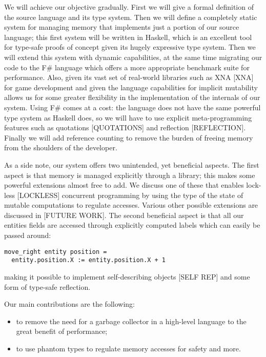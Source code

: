 We will achieve our objective gradually. First we will
give a formal definition of the source language and its
type system. Then we will define a completely static
system for managing memory that implements just a portion
of our source language; this first system will be written
in Haskell, which is an excellent tool for type-safe
proofs of concept given its hugely expressive type system. Then we will extend this system with dynamic capabilities,
at the same time migrating  our code to the F\# language which offers a more appropriate benchmark suite for performance. Also, given its vast set of real-world
libraries such as XNA [XNA] for game development and given
the language capabilities for implicit mutability allows 
us for some greater flexibility in the implementation of
the internals of our system. Using F\# comes at a cost:
the language does not have the same powerful type system
as Haskell does, so we will have to use explicit
meta-programming features such as quotations [QUOTATIONS]
and reflection [REFLECTION]. Finally we will add reference
counting to remove the burden of freeing memory from the
shoulders of the developer.


As a side note, our system offers two unintended, yet
beneficial aspects. The first aspect is that memory is
managed explicitly through a library; this makes some 
powerful extensions almost free to add. We discuss one
of these that enables lock-less [LOCKLESS] concurrent 
programming by using the type of the state of mutable
computations to regulate accesses. Various other possible
extensions are discussed in [FUTURE WORK]. The second
beneficial aspect is that all our entities fields are
accessed through explicitly computed labels which can
easily be passed around:

\begin{lstlisting}
move_right entity position =
  entity.position.X := entity.position.X + 1
\end{lstlisting}

making it possible to implement self-describing objects
[SELF REP] and some form of type-safe reflection.


Our main contributions are the following:
\begin{itemize}
\item to remove the need for a garbage collector in a 
      high-level language to the great benefit of
      performance;
\item to use phantom types to regulate memory accesses
      for safety and more.
\end{itemize}